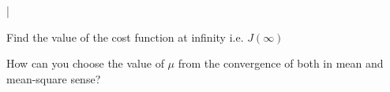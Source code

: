 |\documentclass[journal,12pt,twocolumn]{IEEEtran}
\begin{document}
\begin{problem}
Find the value of the cost function at infinity i.e. $J(\infty)$
\end{problem}
\begin{problem}
How can you choose the value of $\mu$ from the convergence of both in mean and mean-square sense?
\end{problem}
\end{document}
